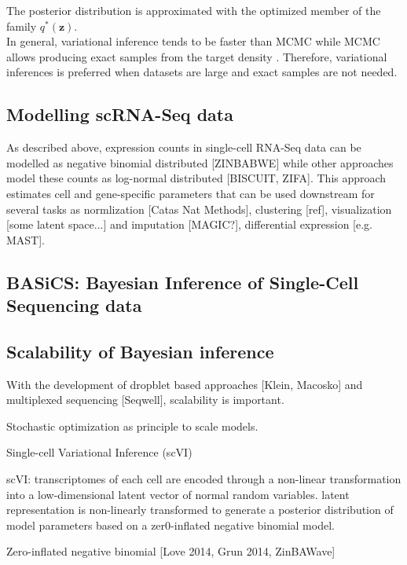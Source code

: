 The posterior distribution is approximated with the optimized member of the family $q^\ast(\mathbf{z})$\citep{Blei2017}.\\
In general, variational inference tends to be faster than MCMC while MCMC allows producing exact samples from the target density \citep{Blei2017}. Therefore, variational inferences is preferred when datasets are large and exact samples are not needed.


\subsection{Modelling scRNA-Seq data}

As described above, expression counts in single-cell RNA-Seq data can be modelled as negative binomial distributed [ZINBABWE] while other approaches model these counts as log-normal distributed [BISCUIT, ZIFA]. This approach estimates cell and gene-specific parameters that can be used downstream for several tasks as normlization [Catas Nat Methods], clustering [ref], visualization [some latent space...] and imputation [MAGIC?], differential expression [e.g. MAST].  

\subsection{BASiCS: Bayesian Inference of Single-Cell Sequencing data} 

\subsection{Scalability of Bayesian inference}

With the development of dropblet based approaches [Klein, Macosko] and multiplexed sequencing [Seqwell], scalability is important.

Stochastic optimization as principle to scale models.

Single-cell Variational Inference (scVI) 

scVI: transcriptomes of each cell are encoded through a non-linear transformation into a low-dimensional latent vector of normal random variables. latent representation is non-linearly transformed to generate a posterior distribution of model parameters based on a zer0-inflated negative binomial model. 

Zero-inflated negative binomial [Love 2014, Grun 2014, ZinBAWave]

